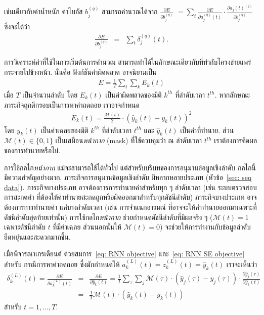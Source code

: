 เช่นเดียวกับค่าน้ำหนัก ค่าไบอัส $b_j^{(q)}$ สามารถคำนวณได้จาก
$\frac{\partial E}{\partial b_j^{(q)}}$
$=\sum_t \frac{\partial E}{\partial a_j^{(q)}(t)} \cdot \frac{\partial a_j(t)^{(q)}}{\partial b_j^{(q)}}$
ซึ่งจะได้ว่า
\begin{eqnarray}
\frac{\partial E}{\partial b_j^{(q)}}
&=&
\sum_t \delta_j^{(q)}(t) 
\label{eq: RNN derivative dE/db} .
\end{eqnarray}

การวิเคราะห์ค่าที่ใช้ในการเริ่มต้นการคำนวณ
สามารถทำได้ในลักษณะเดียวกับที่ทำกับโครงข่ายแพร่กระจายไปข้างหน้า.
นั่นคือ ฟังก์ชันค่าผิดพลาด อาจนิยามเป็น 
\begin{eqnarray}
E = \frac{1}{T} \sum_t \sum_k E_k(t)
\label{eq: RNN objective}
\end{eqnarray}
เมื่อ $T$ เป็นจำนวนลำดับ %
โดย $E_k(t)$ เป็นค่าผิดพลาดของมิติ $k^{th}$ ที่ลำดับเวลา $t^{th}$.
หากลักษณะภาระกิจถูกตีกรอบเป็นการหาค่าถดถอย
เราอาจกำหนด 
\begin{eqnarray}
E_k(t) = \frac{\mathcal{M}(t)}{2} \cdot (\hat{y}_k(t) - y_k(t))^2
\label{eq: RNN SE objective}
\end{eqnarray}
โดย $y_k(t)$ เป็นค่าเฉลยของมิติ $k^{th}$ ที่ลำดับเวลา $t^{th}$ 
และ $\hat{y}_k(t)$ เป็นค่าที่ทำนาย.
ส่วน $\mathcal{M}(t) \in \{0, 1\}$
เป็นเสมือน\textit{หน้ากาก} (mask) ที่ใช้ควบคุมว่า ณ ลำดับเวลา $t^{th}$ เราต้องการคิดผลของการทำนายหรือไม่.

การใช้กลไก\textit{หน้ากาก} แม้จะสามารถใช้ได้ทั่วไป
แต่สำหรับบริบทของการอนุมานข้อมูลเชิงลำดับ กลไกนี้มีความสำคัญอย่างมาก.
ภาระกิจการอนุมานข้อมูลเชิงลำดับ มีหลากหลายประเภท (หัวข้อ~\ref{sec: seq data}).
ภาระกิจบางประเภท อาจต้องการการทำนายค่าสำหรับทุก ๆ ลำดับเวลา (เช่น ระบบตรวจสอบการสะกดคำ ที่ต้องให้ค่าทำนายสะกดถูกหรือผิดออกมาสำหรับทุกดัชนีลำดับ)
ภาระกิจบางประเภท อาจต้องการการทำนายค่า แค่บางลำดับเวลา (เช่น การจำแนกอารมณ์ ที่อาจจะให้ค่าทำนายออกมาเฉพาะที่ดัชนีลำดับสุดท้ายเท่านั้น)
%
การใช้กลไก\textit{หน้ากาก} ช่วยกำหนดดัชนีลำดับที่มีผลจริง ๆ 
($\mathcal{M}(t) = 1$ เฉพาะดัชนีลำดับ $t$ ที่มีค่าเฉลย ส่วนนอกนั้นให้ $\mathcal{M}(t) = 0$)
จะช่วยให้การทำงานกับข้อมูลลำดับยืดหยุ่นและสะดวกมากขึ้น.

เมื่อพิจารณาเกรเดียนต์ ด้วยสมการ~\ref{eq: RNN objective} และ~\ref{eq: RNN SE objective}
สำหรับ กรณีการหาค่าถดถอย ซึ่งมักกำหนดให้ $a^{(L)}_k(t) = z^{(L)}_k(t) = \hat{y}_k(t)$
เราจะเห็นว่า
\begin{eqnarray}
\delta_k^{(L)} (t) = \frac{\partial E}{\partial a^{(L)}_k(t)}
&=& \frac{\partial E}{\partial \hat{y}_k(t)}
= \frac{1}{T} \sum_{\tau} \sum_j \mathcal{M}(\tau) \cdot \left(\hat{y}_j(\tau) - y_j(\tau)\right) 
\cdot \frac{\partial \hat{y}_j(\tau)}{\partial \hat{y}_k(t)}
\nonumber \\
&=& \frac{1}{T} \mathcal{M}(t) \cdot \left(\hat{y}_k(t) - y_k(t)\right) 
\label{eq: RNN delta L}
\end{eqnarray}
สำหรับ $t = 1, \ldots, T$.




